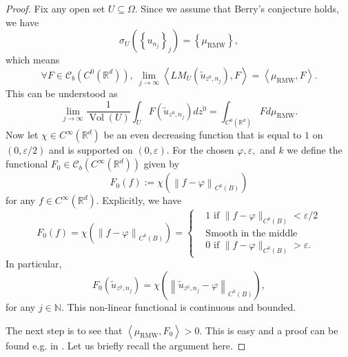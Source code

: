 \documentclass{amsart}
\theoremstyle{definition}
\theoremstyle{remark}
\newcommand{\ep}{\varepsilon}
\def\NN{\mathbb{N}}
\def\RR{\mathbb{R}}
\DeclareMathOperator\Vol{Vol} \DeclareMathOperator\GL{GL} \DeclareMathOperator\orto{O}
\numberwithin{equation}{section}
\theoremstyle{definition}
\theoremstyle{remark}
\def\RR{\mathbb{R}}
\newcommand\muRMW{\mu_{\mathrm{RMW}}}
\def\NN{\mathbb{N}}
\newcommand{\LM}{LM}
\begin{document}
\begin{proof}
	Fix any open set $U\subseteq \Omega$.	Since we assume that Berry's conjecture holds, we have	\begin{equation}
		\sigma_U\left(\left\{u_{n_j}\right\}_j\right)=\left\{\muRMW\right\},
	\end{equation}which means \begin{equation}
		\forall F\in \mathcal{C}_b\left(C^0\left(\RR^d\right)\right), \ \lim_{j\rightarrow\infty}\left\langle \LM_{U}\left(\tilde{u}_{z^0,n_j}\right), F\right\rangle=\left\langle \muRMW, F\right\rangle.
	\end{equation}This can be understood as \begin{equation}
		\lim_{j\rightarrow\infty}\frac{1}{\Vol(U)}\int_{U}F\left(\tilde{u}_{z^0,n_j}\right)dz^0=\int_{C^0\left(\RR^d\right)}Fd\muRMW. 
	\end{equation}Now let $\chi\in C^\infty(\mathbb{R}^d)$ be an even decreasing function that is equal to $1$ on $(0,\ep/2)$ and is supported on $(0,\ep)$. For the chosen $\varphi,\ep,$ and $k$ we define the functional $F_0\in \mathcal{C}_b(C^\infty\left(\RR^d\right))$ given by \begin{equation}
		F_0(f):=\chi\left(\left\|f-\varphi\right\|_{C^k(B)}\right)
	\end{equation}for any $f\in C^\infty(\mathbb{R}^d)$. Explicitly, we have  \begin{equation}
		F_0(f)=\chi\left(\left\|f-\varphi\right\|_{C^k(B)}\right)=\left\{\begin{aligned}
			&1 \text{ if } \|f-\varphi\|_{C^k(B)}<\ep/2 \\
			&\text{Smooth in the middle}\\
			&	0 \text{ if } \|f-\varphi\|_{C^k(B)}>\ep.
		\end{aligned}\right.
	\end{equation}In particular,  \begin{equation}
		F_0\left(\tilde{u}_{z^0,n_j}\right)=\chi\left(\left\|\tilde{u}_{z^0,n_j}-\varphi\right\|_{C^k(B)}\right),
	\end{equation}for any $j\in\NN$. This non-linear functional is continuous and bounded.
	
	The next step is to see that  $\left\langle \muRMW, F_0\right\rangle>0$. This is easy and a proof can be found e.g. in \cite{Yo}.  Let us briefly recall the argument here.
	 

\end{proof}
\end{document}
